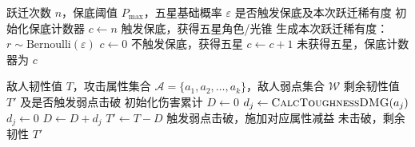 \begin{breakablealgorithm}
    \caption{跃迁保底计数}
    \label{alg:pity}
    \begin{algorithmic}[1]
        \Require 跃迁次数 $n$，保底阈值 $P_{\max}$，五星基础概率 $\varepsilon$
        \Ensure 是否触发保底及本次跃迁稀有度
        \State 初始化保底计数器 $c \gets n$
                \State \Return 触发保底，获得五星角色/光锥
            \Else
                \State 生成本次跃迁稀有度：$r \sim \text{Bernoulli}(\varepsilon)$
                    \State $c \gets 0$ 
                    \State \Return 不触发保底，获得五星
                \Else
                    \State $c \gets c + 1$ 
                \EndIf
            \EndIf
        \EndFor
        \State \Return 未获得五星，保底计数器为 $c$
    \end{algorithmic}
\end{breakablealgorithm}

\begin{breakablealgorithm}
    \caption{弱点击破韧性判定}
    \label{alg:break}
    \begin{algorithmic}[1]
        \Require 敌人韧性值 $T$，攻击属性集合 $\mathcal{A} = \{a_1, a_2, \ldots, a_k\}$，敌人弱点集合 $\mathcal{W}$
        \Ensure 剩余韧性值 $T'$ 及是否触发弱点击破
        \State 初始化伤害累计 $D \gets 0$
                \State $d_j \gets \Call{CalcToughnessDMG}{a_j}$ 
            \Else
                \State $d_j \gets 0$ 
            \EndIf
            \State $D \gets D + d_j$
        \EndFor
        \State $T' \gets T - D$
            \State \Return 触发弱点击破，施加对应属性减益
        \Else
            \State \Return 未击破，剩余韧性 $T'$
        \EndIf
    \end{algorithmic}
\end{breakablealgorithm}